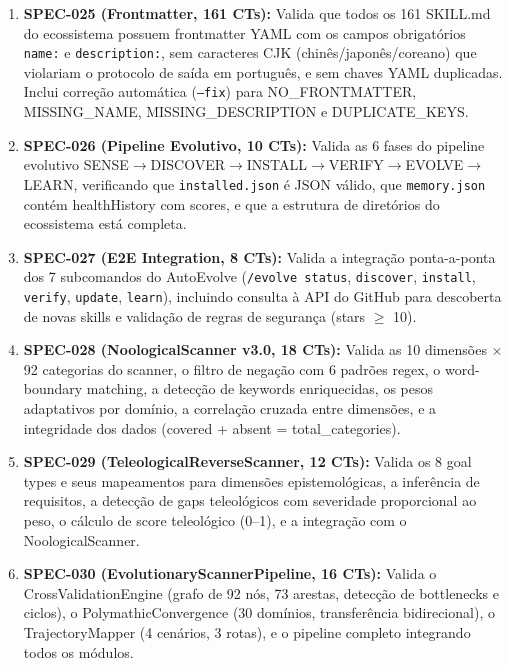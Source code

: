 \begin{enumerate}
  \item \textbf{SPEC-025 (Frontmatter, 161 CTs):} Valida que todos os 161 SKILL.md do ecossistema possuem frontmatter YAML com os campos obrigatórios \texttt{name:} e \texttt{description:}, sem caracteres CJK (chinês/japonês/coreano) que violariam o protocolo de saída em português, e sem chaves YAML duplicadas. Inclui correção automática (\texttt{--fix}) para NO\_FRONTMATTER, MISSING\_NAME, MISSING\_DESCRIPTION e DUPLICATE\_KEYS.

  \item \textbf{SPEC-026 (Pipeline Evolutivo, 10 CTs):} Valida as 6 fases do pipeline evolutivo SENSE$\rightarrow$DISCOVER$\rightarrow$INSTALL$\rightarrow$VERIFY$\rightarrow$EVOLVE$\rightarrow$LEARN, verificando que \texttt{installed.json} é JSON válido, que \texttt{memory.json} contém healthHistory com scores, e que a estrutura de diretórios do ecossistema está completa.

  \item \textbf{SPEC-027 (E2E Integration, 8 CTs):} Valida a integração ponta-a-ponta dos 7 subcomandos do AutoEvolve (\texttt{/evolve status}, \texttt{discover}, \texttt{install}, \texttt{verify}, \texttt{update}, \texttt{learn}), incluindo consulta à API do GitHub para descoberta de novas skills e validação de regras de segurança (stars $\geq$ 10).

  \item \textbf{SPEC-028 (NoologicalScanner v3.0, 18 CTs):} Valida as 10 dimensões $\times$ 92 categorias do scanner, o filtro de negação com 6 padrões regex, o word-boundary matching, a detecção de keywords enriquecidas, os pesos adaptativos por domínio, a correlação cruzada entre dimensões, e a integridade dos dados (covered + absent = total\_categories).

  \item \textbf{SPEC-029 (TeleologicalReverseScanner, 12 CTs):} Valida os 8 goal types e seus mapeamentos para dimensões epistemológicas, a inferência de requisitos, a detecção de gaps teleológicos com severidade proporcional ao peso, o cálculo de score teleológico (0--1), e a integração com o NoologicalScanner.

  \item \textbf{SPEC-030 (EvolutionaryScannerPipeline, 16 CTs):} Valida o CrossValidationEngine (grafo de 92 nós, 73 arestas, detecção de bottlenecks e ciclos), o PolymathicConvergence (30 domínios, transferência bidirecional), o TrajectoryMapper (4 cenários, 3 rotas), e o pipeline completo integrando todos os módulos.


\end{enumerate}
